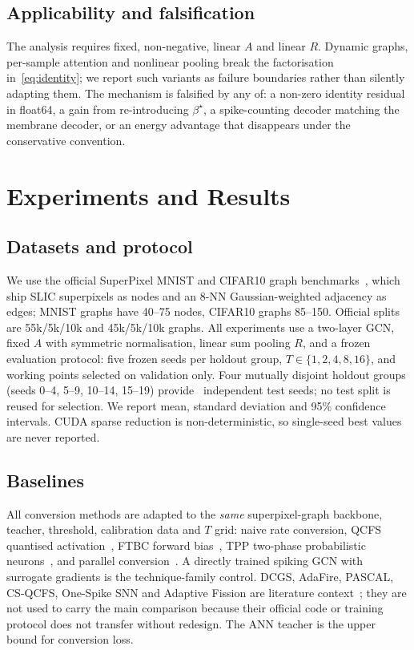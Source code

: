 \subsection{Applicability and falsification}
\label{ssec:scope}

The analysis requires fixed, non-negative, linear $A$ and linear $R$. Dynamic graphs, per-sample attention and nonlinear pooling break the factorisation in~\eqref{eq:identity}; we report such variants as failure boundaries rather than silently adapting them. The mechanism is falsified by any of: a non-zero identity residual in float64, a gain from re-introducing $\beta^\star$, a spike-counting decoder matching the membrane decoder, or an energy advantage that disappears under the conservative convention.

\section{Experiments and Results}
\label{sec:experiments}

\subsection{Datasets and protocol}
\label{ssec:data}

We use the official SuperPixel MNIST and CIFAR10 graph benchmarks~\cite{dwivedi2023}, which ship SLIC superpixels as nodes and an 8-NN Gaussian-weighted adjacency as edges; MNIST graphs have 40--75 nodes, CIFAR10 graphs 85--150. Official splits are 55k/5k/10k and 45k/5k/10k graphs. All experiments use a two-layer GCN, fixed $A$ with symmetric normalisation, linear sum pooling $R$, and a frozen evaluation protocol: five frozen seeds per holdout group, $T\in\{1,2,4,8,16\}$, and working points selected on validation only. Four mutually disjoint holdout groups (seeds 0--4, 5--9, 10--14, 15--19) provide \TotalSeeds\ independent test seeds; no test split is reused for selection. We report mean, standard deviation and 95\% confidence intervals. CUDA sparse reduction is non-deterministic, so single-seed best values are never reported.

\subsection{Baselines}
\label{ssec:baselines}

All conversion methods are adapted to the \emph{same} superpixel-graph backbone, teacher, threshold, calibration data and $T$ grid: naive rate conversion, QCFS quantised activation~\cite{bu2022qcfs}, FTBC forward bias~\cite{wu2024ftbc}, TPP two-phase probabilistic neurons~\cite{bojkovic2025tpp}, and parallel conversion~\cite{hao2025parallel}. A directly trained spiking GCN with surrogate gradients is the technique-family control. DCGS, AdaFire, PASCAL, CS-QCFS, One-Spike SNN and Adaptive Fission are literature context~\cite{huang2025dcgs,wang2025adafire,ramesh2025pascal,yang2025csqcfs,hwang2025onespike,jiang2025fission}; they are not used to carry the main comparison because their official code or training protocol does not transfer without redesign. The ANN teacher is the upper bound for conversion loss.

